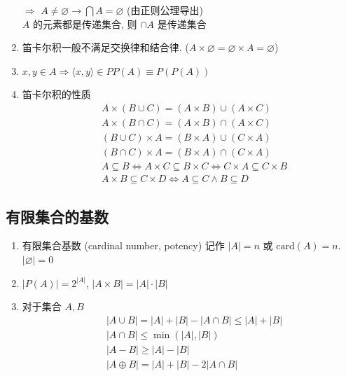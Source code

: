 \documentclass[11pt,a4paper,twocolumn,fleqn]{article} %
\renewcommand{\emptyset}{\varnothing}
\begin{document}
\begin{enumerate}
	$\Rightarrow $ $A\neq \emptyset \to \bigcap A = \emptyset$ (由正则公理导出)\\
	$A$ 的元素都是传递集合, 则 $\cap A$ 是传递集合
	\item 笛卡尔积一般不满足交换律和结合律. 
	($A\times \emptyset = \emptyset\times A = \emptyset$)
	\item $x,y\in A \Rightarrow \langle x, y \rangle \in PP(A)\equiv P(P(A))$
	\item 笛卡尔积的性质
	\begin{align*}
		& A\times (B\cup C) = (A\times B)\cup (A\times C) \\
		& A\times (B\cap C) = (A\times B)\cap (A\times C) \\
		& (B \cup C)\times A = (B\times A)\cup (C\times A) \\
		& (B \cap C)\times A = (B\times A)\cap (C\times A) \\
		& A\subseteq B \Leftrightarrow A\times C\subseteq B\times C
		\Leftrightarrow C\times A \subseteq C\times B \\
		& A\times B \subseteq C\times D 
		\Leftrightarrow A\subseteq C\land B\subseteq D
	\end{align*}
\end{enumerate}
\subsection{有限集合的基数} %
\label{sub:limited_set_num}
\begin{enumerate}
	\item 有限集合基数 (cardinal number, potency) 记作
	$|A| = n$ 或 $\mathrm{card}(A) = n$. $|\emptyset | = 0$
	\item $|P(A)|=2^{|A|}$, $|A\times B|=|A|\cdot|B|$
	\item 对于集合 $A, B$
	\begin{align*}
		&|A\cup B| = |A| + |B| - |A\cap B| \le |A| + |B| \\
		&|A\cap B| \le \min (|A|, |B|) \\
		&|A-B| \ge |A|-|B| \\
		&|A\oplus B| = |A| + |B| - 2|A\cap B|
	\end{align*}
\end{enumerate}
\end{document}
